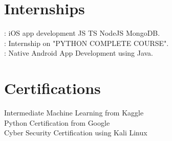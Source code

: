 \documentclass[]{deedy-resume-openfont}
\begin{document}
\begin{minipage}[t]{0.66\textwidth}

\section{Internships}

:
\textbullet{} iOS app development \textbullet{} JS \textbullet{} TS \textbullet{} NodeJS \textbullet{} MongoDB. \\
\sectionsep
{}:
Internship on "PYTHON COMPLETE COURSE". \\
\sectionsep
{}:
Native Android App Development using Java. \\

\sectionsep


\section{Certifications}

\textbullet{} Intermediate Machine Learning from Kaggle \\
\textbullet{} Python Certification from Google \\
\textbullet{} Cyber Security Certification using Kali Linux \\
\sectionsep

\end{minipage} 
\end{document}
